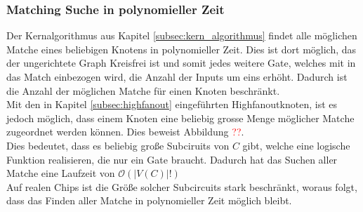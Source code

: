 \documentclass[11pt, a4paper, german]{article}
\begin{document}
\subsubsection{Matching Suche in polynomieller Zeit}
\label{subsubsec:pol_matchen}
Der Kernalgorithmus aus Kapitel \ref{subsec:kern_algorithmus} findet alle möglichen Matche eines beliebigen Knotens in polynomieller Zeit. Dies ist dort möglich, das der ungerichtete Graph Kreisfrei ist und somit jedes weitere Gate, welches mit in das Match einbezogen wird, die Anzahl der Inputs um eins erhöht. Dadurch ist die Anzahl der möglichen Matche für einen Knoten beschränkt.\\
Mit den in Kapitel  \ref{subsec:highfanout} eingeführten Highfanoutknoten, ist es jedoch möglich, dass einem Knoten eine beliebig grosse Menge möglicher Matche zugeordnet werden können. Dies beweist Abbildung \textcolor{red}{??}. \\
Dies bedeutet, dass es beliebig große Subciruits von $C$ gibt, welche eine logische Funktion realisieren, die nur ein Gate braucht. Dadurch hat das Suchen aller Matche eine Laufzeit von $\mathcal{O}(|V(C)|!)$\\
 Auf realen Chips ist die Größe solcher Subcircuits stark beschränkt, woraus folgt, dass das Finden aller Matche in polynomieller Zeit möglich bleibt.\\
\end{document}

